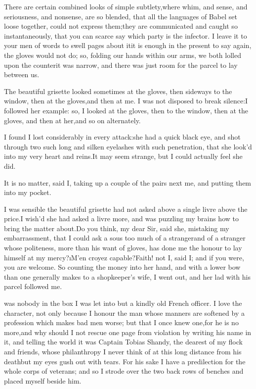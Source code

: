 \documentclass[twoside]{article}
\begin{document}
There are certain combined looks of simple subtlety,\tsk where whim, and
sense, and seriousness, and nonsense, are so blended, that all the
languages of Babel set loose together, could not express them;\tsk they are
communicated and caught so instantaneously, that you can scarce say which
party is the infector.  I leave it to your men of words to swell pages
about it\tsk it is enough in the present to say again, the gloves would not
do; so, folding our hands within our arms, we both lolled upon the
counter\tsk it was narrow, and there was just room for the parcel to lay
between us.

The beautiful grisette looked sometimes at the gloves, then sideways to
the window, then at the gloves,\tsk and then at me.  I was not disposed to
break silence:\tsk I followed her example: so, I looked at the gloves, then
to the window, then at the gloves, and then at her,\tsk and so on
alternately.

I found I lost considerably in every attack:\tsk she had a quick black eye,
and shot through two such long and silken eyelashes with such
penetration, that she look’d into my very heart and reins.\tsk It may seem
strange, but I could actually feel she did.\tsk 

It is no matter, said I, taking up a couple of the pairs next me, and
putting them into my pocket.

I was sensible the beautiful grisette had not asked above a single livre
above the price.\tsk I wish’d she had asked a livre more, and was puzzling my
brains how to bring the matter about.\tsk Do you think, my dear Sir, said
she, mistaking my embarrassment, that I could ask a sous too much of a
stranger\tsk and of a stranger whose politeness, more than his want of
gloves, has done me the honour to lay himself at my mercy?\tsk \i{M’en croyez
capable}?\tsk Faith! not I, said I; and if you were, you are welcome.  So
counting the money into her hand, and with a lower bow than one generally
makes to a shopkeeper’s wife, I went out, and her lad with his parcel
followed me.






 was nobody in the box I was let into but a kindly old French
officer.  I love the character, not only because I honour the man whose
manners are softened by a profession which makes bad men worse; but that
I once knew one,\tsk for he is no more,\tsk and why should I not rescue one page
from violation by writing his name in it, and telling the world it was
Captain Tobias Shandy, the dearest of my flock and friends, whose
philanthropy I never think of at this long distance from his death\tsk but my
eyes gush out with tears.  For his sake I have a predilection for the
whole corps of veterans; and so I strode over the two back rows of
benches and placed myself beside him.
\end{document}
